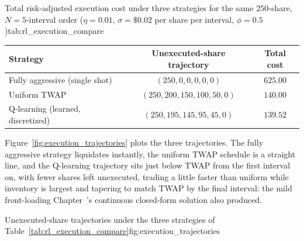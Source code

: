 \documentclass[../ai_in_finance]{subfiles}
\begin{document}
\begin{booktable}[htbp]{Total risk-adjusted execution cost under three strategies for the same $250$-share, $N=5$-interval order ($\eta=0.01$, $\sigma=\$0.02$ per share per interval, $\phi=0.5$)}{tab:rl_execution_compare}
\begin{tabular}{lcc}
\toprule
Strategy & Unexecuted-share trajectory & Total cost \\
\midrule
Fully aggressive (single shot) & $(250, 0, 0, 0, 0, 0)$ & $625.00$ \\
Uniform TWAP & $(250, 200, 150, 100, 50, 0)$ & $140.00$ \\
Q-learning (learned, discretized) & $(250, 195, 145, 95, 45, 0)$ & $139.52$ \\
\bottomrule
\end{tabular}
\end{booktable}

Figure~\ref{fig:execution_trajectories} plots the three trajectories. The fully aggressive strategy liquidates instantly, the uniform TWAP schedule is a straight line, and the Q-learning trajectory sits just below TWAP from the first interval on, with fewer shares left unexecuted, trading a little faster than uniform while inventory is largest and tapering to match TWAP by the final interval: the mild front-loading Chapter~'s continuous closed-form solution also produced.

\begin{bookfigure}[htbp]{Unexecuted-share trajectories under the three strategies of Table~\ref{tab:rl_execution_compare}}{fig:execution_trajectories}
\end{bookfigure}
\end{document}
